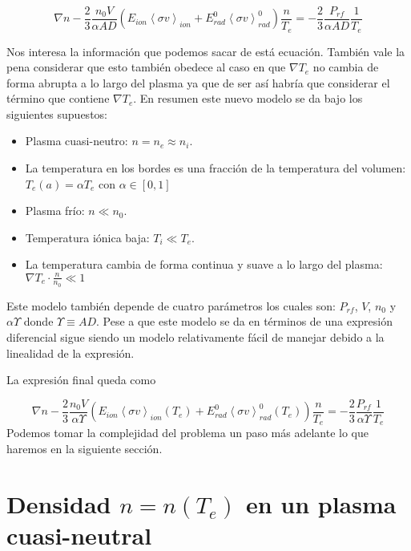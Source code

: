 \documentclass[11pt]{article}
\theoremstyle{definition}
\begin{document}
    \begin{equation}
      \nabla n - \frac{2}{3}\frac{n_0 V}{\alpha AD}\left(  E_{ion}\left<\sigma v\right>_{ion} + E_{rad}^0\left<\sigma v\right>_{rad}^0\right)\frac{n}{T_e} = - \frac{2}{3}\frac{P_{rf}}{\alpha AD}\frac{1}{T_e}
    \end{equation}

  Nos interesa la informaci\'on que podemos sacar de est\'a ecuaci\'on. Tambi\'en vale la pena considerar que esto tambi\'en obedece al caso en que $\nabla T_e$ no cambia de forma abrupta a lo largo del plasma ya que de ser as\'i habr\'ia que considerar el t\'ermino que contiene $\nabla T_e$. En resumen este nuevo modelo se da bajo los siguientes supuestos:

  \begin{itemize}
    \item Plasma cuasi-neutro: $n = n_e \approx n_i$.
    \item La temperatura en los bordes es una fracci\'on de la temperatura del volumen: $T_e(a) = \alpha T_e$ con $\alpha \in [0,1]$
    \item Plasma fr\'io: $n \ll n_0$.
    \item Temperatura i\'onica baja: $T_i \ll T_e$.
    \item La temperatura cambia de forma continua y suave a lo largo del plasma: $\nabla T_e \cdot \frac{n}{n_0} \ll 1$
  \end{itemize}

  Este modelo tambi\'en depende de cuatro par\'ametros los cuales son: $P_{rf}$, $V$, $n_0$ y $\alpha\varUpsilon$ donde $\varUpsilon \equiv A D$. Pese a que este modelo se da en t\'erminos de una expresi\'on diferencial sigue siendo un modelo relativamente f\'acil de manejar debido a la linealidad de la expresi\'on. 

  La expresi\'on final queda como 

  \begin{equation}
    \nabla n - \frac{2}{3}\frac{n_0 V}{\alpha \varUpsilon}\left(  E_{ion}\left<\sigma v\right>_{ion}(T_e) + E_{rad}^0\left<\sigma v\right>_{rad}^0(T_e)\right)\frac{n}{T_e} = - \frac{2}{3}\frac{P_{rf}}{\alpha \varUpsilon}\frac{1}{T_e}
  \end{equation}
  Podemos tomar la complejidad del problema un paso m\'as adelante lo que haremos en la siguiente secci\'on.

  \section{Densidad $n = n(T_e)$ en un plasma cuasi-neutral}
\end{document}
